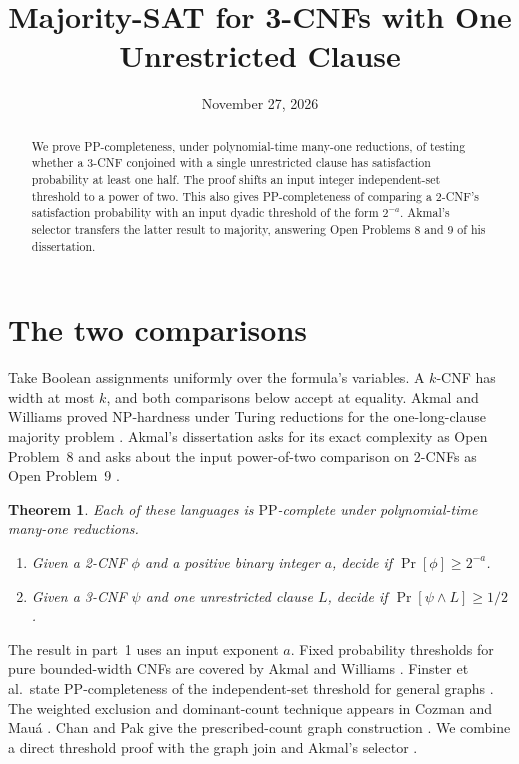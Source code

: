 \documentclass[11pt,a4paper]{amsart}
\title{Majority-SAT for 3-CNFs with One Unrestricted Clause}
\date{November 27, 2026}
\newtheorem{theorem}{Theorem}
\newcommand{\PP}{\mathrm{PP}}
\begin{document}
\begin{abstract}
We prove PP-completeness, under polynomial-time many-one reductions, of testing whether a 3-CNF conjoined with a single unrestricted clause has satisfaction probability at least one half. The proof shifts an input integer independent-set threshold to a power of two. This also gives PP-completeness of comparing a 2-CNF's satisfaction probability with an input dyadic threshold of the form \(2^{-a}\). Akmal's selector transfers the latter result to majority, answering Open Problems 8 and 9 of his dissertation.
\end{abstract}
\maketitle

\section{The two comparisons}

Take Boolean assignments uniformly over the formula's variables. A \(k\)-CNF has width at most \(k\), and both comparisons below accept at equality. Akmal and Williams proved NP-hardness under Turing reductions for the one-long-clause majority problem \cite[Thm.~7.2]{akmalwilliams}. Akmal's dissertation asks for its exact complexity as Open Problem~8 and asks about the input power-of-two comparison on 2-CNFs as Open Problem~9 \cite[p.~94]{akmal}.

\begin{theorem}\label{main}
Each of these languages is \(\PP\)-complete under polynomial-time many-one reductions.
\begin{enumerate}
\item Given a 2-CNF \(\phi\) and a positive binary integer \(a\), decide if \(\Pr[\phi]\ge 2^{-a}\).
\item Given a 3-CNF \(\psi\) and one unrestricted clause \(L\), decide if \(\Pr[\psi\wedge L]\ge 1/2\).
\end{enumerate}
\end{theorem}

The result in part~1 uses an input exponent \(a\). Fixed probability thresholds for pure bounded-width CNFs are covered by Akmal and Williams \cite[Thm.~1.1]{akmalwilliams}. Finster et al.\ state PP-completeness of the independent-set threshold for general graphs \cite[App.~C.2, Problem~5, v4]{finster}. The weighted exclusion and dominant-count technique appears in Cozman and Mau\'a \cite[App.~A, proof of Thm.~2]{cozman}. Chan and Pak give the prescribed-count graph construction \cite[Ex.~5.8]{chanpak}. We combine a direct threshold proof with the graph join and Akmal's selector \cite[Lemma~4.11]{akmal}.
\end{document}
